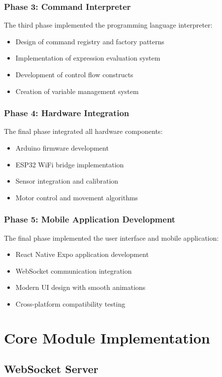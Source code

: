\subsubsection{Phase 3: Command Interpreter}
The third phase implemented the programming language interpreter:
\begin{itemize}
    \item Design of command registry and factory patterns
    \item Implementation of expression evaluation system
    \item Development of control flow constructs
    \item Creation of variable management system
\end{itemize}

\subsubsection{Phase 4: Hardware Integration}
The final phase integrated all hardware components:
\begin{itemize}
    \item Arduino firmware development
    \item ESP32 WiFi bridge implementation
    \item Sensor integration and calibration
    \item Motor control and movement algorithms
\end{itemize}


\subsubsection{Phase 5: Mobile Application Development}
The final phase implemented the user interface and mobile application:
\begin{itemize}
    \item React Native Expo application development
    \item WebSocket communication integration
    \item Modern UI design with smooth animations
    \item Cross-platform compatibility testing
\end{itemize}

\section{Core Module Implementation}

\subsection{WebSocket Server}

